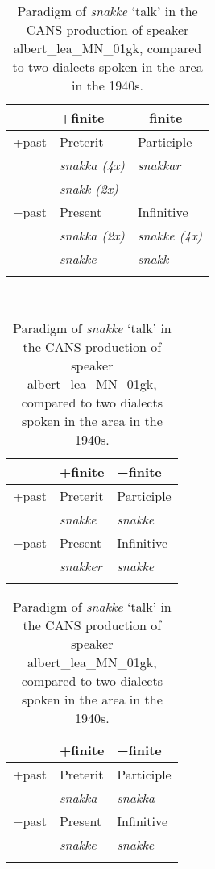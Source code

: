 \documentclass[output=paper]{langscibook}
\begin{document}
\begin{table}[h]
\begin{subtable}{.5\textwidth}\centering
\caption{}\label{tab:eide:4a}
\begin{tabular}{lll}
\lsptoprule
      & +finite & −finite\\\midrule    
+past & Preterit    & Participle \\
      & \textit{snakka (4x)} & \textit{snakkar}    \\
      & \textit{snakk (2x)}  &            \\
−past & Present     & Infinitive \\
      & \textit{snakka (2x)} & \textit{snakke (4x)} \\
      & \textit{snakke}      & \textit{snakk}      \\
\lspbottomrule
\end{tabular}
\end{subtable}\medskip\\
\begin{subtable}{.5\textwidth}\centering
\caption{}\label{tab:eide:4b}
\begin{tabular}{lll}
\lsptoprule
      & +finite & −finite\\\midrule   
+past & Preterit    & Participle \\
      & \textit{snakke}      & \textit{snakke} \\
−past & Present     & Infinitive\\
      & \textit{snakker}     & \textit{snakke} \\
\lspbottomrule
\end{tabular}
\end{subtable}\begin{subtable}{.5\textwidth}\centering
\caption{}\label{tab:eide:4c}
\begin{tabular}{lll}
\lsptoprule
      & +finite & −finite\\\midrule   
+past & Preterit    & Participle \\
      & \textit{snakka}      & \textit{snakka} \\
−past & Present     & Infinitive\\
      & \textit{snakke}      & \textit{snakke} \\
\lspbottomrule
\end{tabular}
\end{subtable}
\caption{Paradigm of \textit{snakke} ‘talk’ in the CANS production of speaker albert\_lea\_MN\_01gk, compared to two dialects spoken in the area in the 1940s.}
\label{tab:eide:4}
\end{table}
\end{document}

